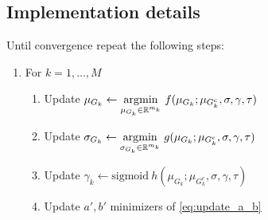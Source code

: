 \documentclass[12pt]{article}
\begin{document}


\subsection{Implementation details}

Until convergence repeat the following steps:
\begin{enumerate}
    \item For $k=1,\dots,M$
    \begin{enumerate}
	\item Update $\mu_{G_k} \leftarrow \underset{\mu_{G_k} \in \mathbb{R}^{m_k}}{{\arg\!\min}}\ f(\mu_{G_k}; \mu_{G_k^c}, \sigma, \gamma, \tau)$
	\item Update $\sigma_{G_k} \leftarrow \underset{\sigma_{G_k} \in \mathbb{R}^{m_k}}{{\arg\!\min}}\ g(\mu_{G_k}; \mu_{G_k^c}, \sigma, \gamma, \tau)$
	\item Update $\gamma_k \leftarrow \text{sigmoid} \ h(\mu_{G_k}; \mu_{G_k^c}, \sigma, \gamma, \tau)$
	\item Update $a', b'$ minimizers of \eqref{eq:update_a_b}
    \end{enumerate}
\end{enumerate}
\end{document}
